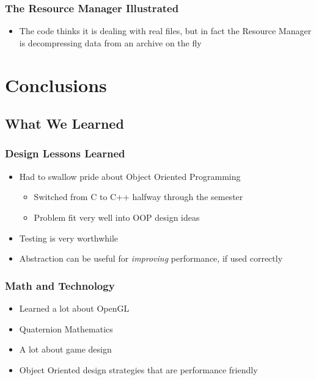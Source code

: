 \documentclass{beamer}
\begin{document}
\begin{frame}
   \frametitle{The Resource Manager Illustrated}
   \begin{itemize}
      \item The code thinks it is dealing with real files, but in fact the Resource
      Manager is decompressing data from an archive on the fly
   \end{itemize}
   \begin{center}
   \end{center}
\end{frame}

\section{Conclusions}

\subsection{What We Learned}

\begin{frame}
   \frametitle{Design Lessons Learned}
   \begin{itemize}
      \item Had to swallow pride about Object Oriented Programming
      \begin{itemize}
         \item Switched from C to C++ halfway through the semester
         \item Problem fit very well into OOP design ideas
      \end{itemize}
      \item Testing is very worthwhile
      \item Abstraction can be useful for \emph{improving} performance, if used
      correctly
   \end{itemize}
\end{frame}

\begin{frame}
   \frametitle{Math and Technology}
   \begin{itemize}
      \item Learned a lot about OpenGL
      \item Quaternion Mathematics
      \item A lot about game design
      \item Object Oriented design strategies that are performance friendly
   \end{itemize}
\end{frame}
\end{document}

